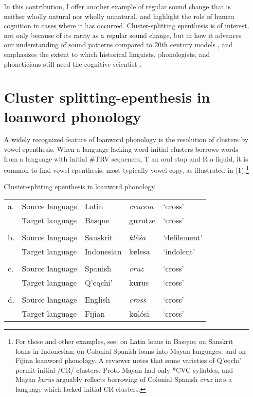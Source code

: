 \documentclass[output=paper,
modfonts
]{LSP/langsci}
\begin{document}
In this contribution, I offer another example of regular sound change
that is neither wholly natural nor wholly unnatural, and highlight the
role of human cognition in cases where it has occurred.
Cluster-splitting epenthesis is of interest, not only because of its
rarity as a regular sound change, but in how it advances our
understanding of sound patterns compared to 20th century models \citep{anderson1985a}, and emphasizes the extent to which historical
linguists, phonologists, and phoneticians still need the cognitive
scientist \citep{anderson2001a}.

\section{Cluster splitting-epenthesis in loanword phonology}

A widely recognized feature of loanword phonology is the resolution of
clusters by vowel epenthesis. When a language lacking word-initial
clusters borrows words from a language with initial \#TRV sequences, T
an oral stop and R a liquid, it is common to find vowel epenthesis, most
typically vowel-copy, as illustrated in (1).\footnote{For these and
  other examples, see: \citet{blevins2016a} on Latin loans in
  Basque; \citet{decasparis1997a} on Sanskrit loans in Indonesian; \citet{campbell2013a} on Colonial Spanish loans into Mayan languages; and \citet{kenstowicz2007a} on Fijian loanword phonology. A reviewer notes that some
  varieties of Q'eqchi' permit initial /CR/ clusters. Proto-Mayan had
  only *CVC syllables, and Mayan \emph{kurus} arguably reflects
  borrowing of Colonial Spanish \emph{cruz} into a language which lacked
  initial CR clusters.}


\ea Cluster-splitting epenthesis in loanword phonology
\begin{table}
\begin{tabular}{lllll}
a. 	& Source language	& Latin	&  \emph{crucem} & `cross' \\
	& Target language	& Basque	 &  g\textbf{u}rutze & `cross' \\
& & & & \\
b.	& Source language 	& Sanskrit  & \emph{klēśa} &  `defilement' \\
	& Target language 	& Indonesian	&  k\textbf{e}lesa  & `indolent' \\
& & & & \\
c.	& Source language	& Spanish &  \emph{cruz} & `cross' \\
	& Target language 	& Q'eqchi' & k\textbf{u}rus & `cross' \\
& & & & \\
d.	& Source language 	& English & \emph{cross} & `cross' \\
	& Target language 	& Fijian  & k\textbf{o}lósi  & `cross' \\
\end{tabular}
\end{table}
\z
\end{document}
